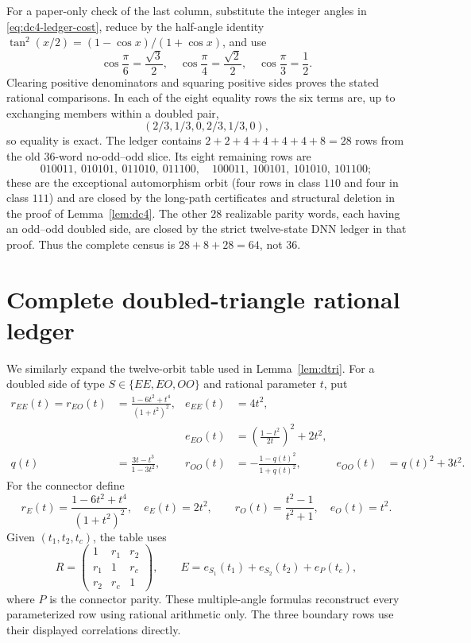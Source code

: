 \documentclass[11pt]{article}
\theoremstyle{remark}
\begin{document}
For a paper-only check of the last column, substitute the integer angles in
\eqref{eq:dc4-ledger-cost}, reduce by the half-angle identity
$\tan^2(x/2)=(1-\cos x)/(1+\cos x)$, and use
\[
 \cos\frac\pi6=\frac{\sqrt3}{2},\quad
 \cos\frac\pi4=\frac{\sqrt2}{2},\quad
 \cos\frac\pi3=\frac12.
\]
Clearing positive denominators and squaring positive sides proves the stated
rational comparisons.  In each of the eight equality rows the six terms are,
up to exchanging members within a doubled pair,
\[
 (2/3,1/3,0,2/3,1/3,0),
\]
so equality is exact.  The ledger contains $2+2+4+4+4+4+8=28$ rows from the
old $36$-word no-odd--odd slice.  Its eight remaining rows are
\[
010011,\ 010101,\ 011010,\ 011100,\quad
100011,\ 100101,\ 101010,\ 101100;
\]
these are the exceptional automorphism orbit (four rows in class $110$ and four
in class $111$) and are closed by the long-path certificates and structural
deletion in the proof of Lemma~\ref{lem:dc4}.  The other $28$ realizable
parity words, each having an odd--odd doubled side, are closed by the strict
twelve-state DNN ledger in that proof.  Thus the complete census is
$28+8+28=64$, not $36$.

\section{Complete doubled-triangle rational ledger}\label{app:dtri-ledger}

We similarly expand the twelve-orbit table used in Lemma~\ref{lem:dtri}.  For
a doubled side of type $S\in\{EE,EO,OO\}$ and rational parameter $t$, put
\begin{align*}
r_{EE}(t)=r_{EO}(t)&=\frac{1-6t^2+t^4}{(1+t^2)^2},
&e_{EE}(t)&=4t^2,\\
&&e_{EO}(t)&=\left(\frac{1-t^2}{2t}\right)^2+2t^2,\\
q(t)&=\frac{3t-t^3}{1-3t^2},
&r_{OO}(t)&=-\frac{1-q(t)^2}{1+q(t)^2},
&e_{OO}(t)&=q(t)^2+3t^2.
\end{align*}
For the connector define
\[
r_E(t)=\frac{1-6t^2+t^4}{(1+t^2)^2},\quad e_E(t)=2t^2,
\qquad r_O(t)=\frac{t^2-1}{t^2+1},\quad e_O(t)=t^2.
\]
Given $(t_1,t_2,t_c)$, the table uses
\[
R=\begin{pmatrix}1&r_1&r_2\\r_1&1&r_c\\r_2&r_c&1\end{pmatrix},
\qquad E=e_{S_1}(t_1)+e_{S_2}(t_2)+e_P(t_c),
\]
where $P$ is the connector parity.  These multiple-angle formulas reconstruct
every parameterized row using rational arithmetic only.  The three boundary
rows use their displayed correlations directly.
\end{document}
